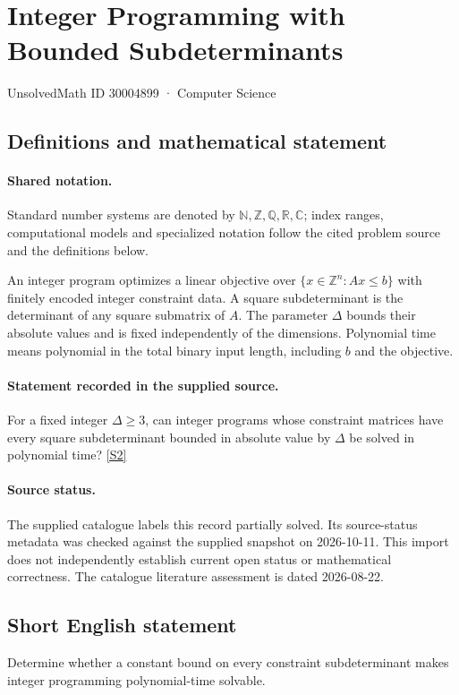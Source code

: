 \documentclass[11pt]{article}
\newcommand{\sref}[2]{\hyperlink{source:#1:#2}{[S#2]}}
\begin{document}
\setcounter{section}{30004898}
\section{Integer Programming with Bounded Subdeterminants}\label{30004899}
{\small\sffamily UnsolvedMath ID 30004899 · Computer Science}
\subsection{Definitions and mathematical statement}

\paragraph{Shared notation.}Standard number systems are denoted by $\mathbb N,\mathbb Z,\mathbb Q,\mathbb R,\mathbb C$; index ranges, computational models and specialized notation follow the cited problem source and the definitions below.


An integer program optimizes a linear objective over $\{x\in\mathbb Z^n:Ax\leq b\}$ with finitely encoded integer constraint data. A square subdeterminant is the determinant of any square submatrix of $A$. The parameter $\Delta$ bounds their absolute values and is fixed independently of the dimensions. Polynomial time means polynomial in the total binary input length, including $b$ and the objective.
\paragraph{Statement recorded in the supplied source.}
For a fixed integer $\Delta\geq3$, can integer programs whose constraint matrices have every square subdeterminant bounded in absolute value by $\Delta$ be solved in polynomial time? \sref{30004899}{2}
\paragraph{Source status.}
The supplied catalogue labels this record partially solved. Its source-status metadata was checked against the supplied snapshot on 2026-10-11. This import does not independently establish current open status or mathematical correctness. The catalogue literature assessment is dated 2026-08-22.
\subsection{Short English statement}
Determine whether a constant bound on every constraint subdeterminant makes integer programming polynomial-time solvable.
\end{document}
